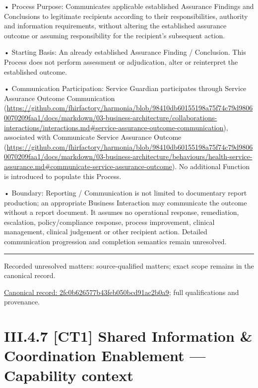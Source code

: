 •
Process Purpose: Communicates applicable established Assurance Findings and Conclusions to legitimate recipients according to their responsibilities, authority and information requirements, without altering the established assurance outcome or assuming responsibility for the recipient's subsequent action.



•
Starting Basis: An already established Assurance Finding / Conclusion. This Process does not perform assessment or adjudication, alter or reinterpret the established outcome.



•
Communication Participation: Service Guardian participates through Service Assurance Outcome Communication (\url{https://github.com/fhirfactory/harmonia/blob/98410db60155198a75f74c79d98060070209faa1/docs/markdown/03-business-architecture/collaborations-interactions/interactions.md#service-assurance-outcome-communication}), associated with Communicate Service Assurance Outcome (\url{https://github.com/fhirfactory/harmonia/blob/98410db60155198a75f74c79d98060070209faa1/docs/markdown/03-business-architecture/behaviours/health-service-assurance.md#communicate-service-assurance-outcome}). No additional Function is introduced to populate this Process.



•
Boundary: Reporting / Communication is not limited to documentary report production; an appropriate Business Interaction may communicate the outcome without a report document. It assumes no operational response, remediation, escalation, policy/compliance response, process improvement, clinical management, clinical judgement or other recipient action. Detailed communication progression and completion semantics remain unresolved.



\medskip\hrule\medskip

{\small Recorded unresolved matters: source-qualified matters; exact scope remains in the canonical record.}\par
{\footnotesize \href{../../../../continuum/business/business-process/2fc0b626577b43feb050bcd91ac2b0a9.md}{Canonical record: 2fc0b626577b43feb050bcd91ac2b0a9}; full qualifications and provenance.}\par
\section*{III.4.7 [CT1] Shared Information \& Coordination Enablement — Capability context}
\label{navigation:III.4.7}


